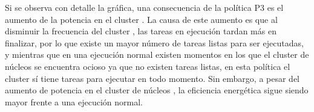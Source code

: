 Si se observa con detalle la gráfica, una consecuencia de la política P3 es
el aumento de la potencia en el cluster \LITTLE. La causa de este aumento es
que al disminuir la frecuencia del cluster \BIG, las tareas en ejecución
tardan más en finalizar, por lo que existe un mayor número de tareas listas
para ser ejecutadas, y mientras que en una ejecución normal existen
momentos en los que el cluster de núcleos \LITTLE se encuentra ocioso ya que
no existen tareas listas, en esta política el cluster sí tiene tareas para
ejecutar en todo momento. Sin embargo, a pesar del aumento de potencia en el
cluster de núcleos \LITTLE, la eficiencia energética sigue siendo mayor frente
a una ejecución normal.

\begin{figure}
  \centering
    \begin{subfigure}{0.75\textwidth}
      \centering
      \caption{\juno}
    \end{subfigure}

    \vspace{0.5cm}


\end{figure}
